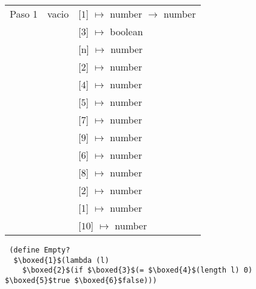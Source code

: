 \documentclass{article}
\begin{document}
\begin{center}
\begin{longtable}{ | l | p{10 cm} | p{5 cm} | }
 Paso 1  & vacio& [$\boxed{1}$] $\mapsto$ number $\rightarrow$ number \\ 
	 &	& [$\boxed{3}$] $\mapsto$ boolean \\
	 &	& [n] $\mapsto$ number \\
	 &	& [2] $\mapsto$ number \\
	 &	& [$\boxed{4}$] $\mapsto$ number \\
	 &	& [$\boxed{5}$] $\mapsto$ number \\
	 &	& [$\boxed{7}$] $\mapsto$ number \\ 
	 &	& [$\boxed{9}$] $\mapsto$ number \\ 
	 &	& [$\boxed{6}$] $\mapsto$ number \\ 
	 &	& [$\boxed{8}$] $\mapsto$ number \\ 
	 &	& [$\boxed{2}$] $\mapsto$ number \\ 
	 &	& [1] $\mapsto$ number \\ 
	 &	& [$\boxed{10}$] $\mapsto$ number \\ \hline
 \end{longtable}

\end{center}

\begin{lstlisting}
 (define Empty?
  $\boxed{1}$(lambda (l)
    $\boxed{2}$(if $\boxed{3}$(= $\boxed{4}$(length l) 0)  $\boxed{5}$true $\boxed{6}$false)))
\end{lstlisting}
\end{document}
